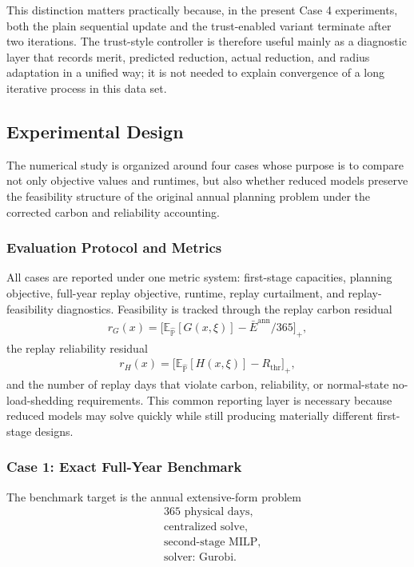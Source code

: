 This distinction matters practically because, in the present Case 4 experiments, both the plain sequential update and the trust-enabled variant terminate after two iterations. The trust-style controller is therefore useful mainly as a diagnostic layer that records merit, predicted reduction, actual reduction, and radius adaptation in a unified way; it is not needed to explain convergence of a long iterative process in this data set.

\subsection{Experimental Design}

The numerical study is organized around four cases whose purpose is to compare not only objective values and runtimes, but also whether reduced models preserve the feasibility structure of the original annual planning problem under the corrected carbon and reliability accounting.

\subsubsection{Evaluation Protocol and Metrics}

All cases are reported under one metric system: first-stage capacities, planning objective, full-year replay objective, runtime, replay curtailment, and replay-feasibility diagnostics. Feasibility is tracked through the replay carbon residual
\begin{align}
r_G(x) = \Big[\mathbb{E}_{\widehat{\mathbb{P}}}[G(x,\xi)] - \bar E^{\mathrm{ann}}/365\Big]_+,
\end{align}
the replay reliability residual
\begin{align}
r_H(x) = \Big[\mathbb{E}_{\widehat{\mathbb{P}}}[H(x,\xi)] - R_{\mathrm{thr}}\Big]_+,
\end{align}
and the number of replay days that violate carbon, reliability, or normal-state no-load-shedding requirements. This common reporting layer is necessary because reduced models may solve quickly while still producing materially different first-stage designs.

\subsubsection{Case 1: Exact Full-Year Benchmark}

The benchmark target is the annual extensive-form problem
\begin{align}
& \text{365 physical days}, \\
& \text{centralized solve}, \\
& \text{second-stage MILP}, \\
& \text{solver: Gurobi}.
\end{align}

